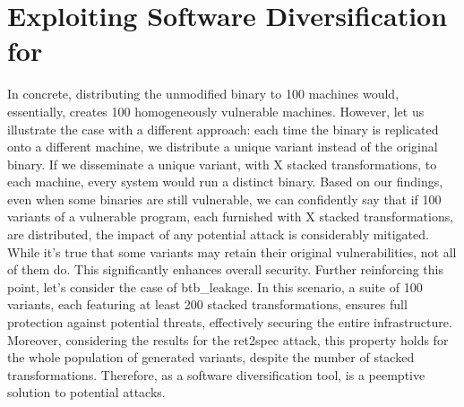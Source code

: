 \chapter{Exploiting Software Diversification for \Wasm}
\label{method}







\label{usecasetime}


In concrete, distributing the unmodified binary to 100 machines would, essentially, creates 100 homogeneously vulnerable machines.
However, let us illustrate the case with a different approach: each time the binary is replicated onto a different machine, we distribute a unique variant instead of the original binary. 
If we disseminate a unique variant, with X stacked transformations, to each machine, every system would run a distinct \wasm binary. 
Based on our findings, even when some binaries are still vulnerable, we can confidently say that if 100 variants of a vulnerable program, each furnished with X stacked transformations, are distributed, the impact of any potential attack is considerably mitigated.
While it's true that some variants may retain their original vulnerabilities, not all of them do. 
This significantly enhances overall security. 
Further reinforcing this point, let's consider the case of btb\_leakage. 
In this scenario, a suite of 100 variants, each featuring at least 200 stacked transformations, ensures full protection against potential threats, effectively securing the entire infrastructure.
Moreover, considering the results for the ret2spec attack, this property holds for the whole population of generated variants, despite the number of stacked transformations.
Therefore, \tool as a software diversification tool, is a peemptive solution to potential attacks.


